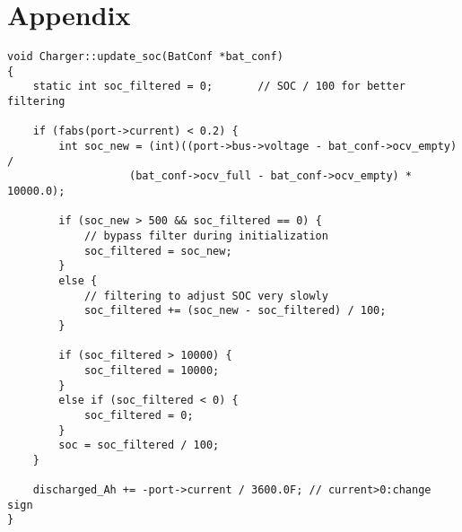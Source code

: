 

\chapter{Appendix}

\label{code:libreSolarSoC}
\begin{lstlisting}
void Charger::update_soc(BatConf *bat_conf)
{
    static int soc_filtered = 0;       // SOC / 100 for better filtering

    if (fabs(port->current) < 0.2) {
        int soc_new = (int)((port->bus->voltage - bat_conf->ocv_empty) /
                   (bat_conf->ocv_full - bat_conf->ocv_empty) * 10000.0);

        if (soc_new > 500 && soc_filtered == 0) {
            // bypass filter during initialization
            soc_filtered = soc_new;
        }
        else {
            // filtering to adjust SOC very slowly
            soc_filtered += (soc_new - soc_filtered) / 100;
        }

        if (soc_filtered > 10000) {
            soc_filtered = 10000;
        }
        else if (soc_filtered < 0) {
            soc_filtered = 0;
        }
        soc = soc_filtered / 100;
    }

    discharged_Ah += -port->current / 3600.0F; // current>0:change sign
}
\end{lstlisting}

\label{pdf:leadacidpanasonic}


